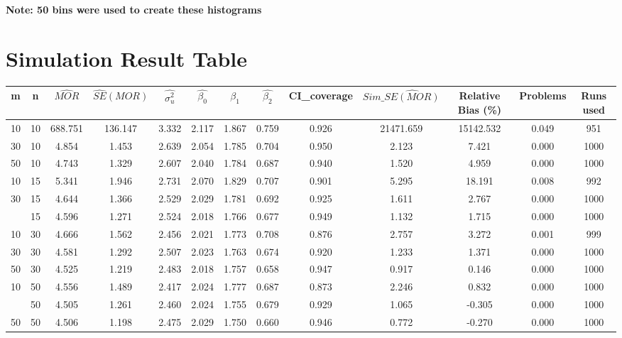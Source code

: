 \documentclass[
  letterpaper,
  DIV=11,
  numbers=noendperiod]{scrartcl}
\begin{document}
\vspace{10mm}

\textbf{Note: 50 bins were used to create these histograms}

\newpage

\recalctypearea
{}

\hypertarget{simulation-result-table}{%
\section{Simulation Result Table}\label{simulation-result-table}}

\begingroup

\fontsize{12pt}{18pt}\selectfont
\addtolength{\tabcolsep}{-2pt}

\begin{tabular}[t]{ccccccccccccc}
\toprule
m & n & $\widehat{MOR}$ & $\widehat{SE}(MOR)$ & $\widehat{\sigma_u^2}$ & $\widehat{\beta_0}$ & $\widehat{\beta_1}$ & $\widehat{\beta_2}$ & CI\_coverage & $Sim\_\widehat{SE(MOR)}$ & Relative Bias (\%) & Problems & Runs used\\
\midrule
10 & 10 & 688.751 & 136.147 & 3.332 & 2.117 & 1.867 & 0.759 & 0.926 & 21471.659 & 15142.532 & 0.049 & 951\\
30 & 10 & 4.854 & 1.453 & 2.639 & 2.054 & 1.785 & 0.704 & 0.950 & 2.123 & 7.421 & 0.000 & 1000\\
50 & 10 & 4.743 & 1.329 & 2.607 & 2.040 & 1.784 & 0.687 & 0.940 & 1.520 & 4.959 & 0.000 & 1000\\
10 & 15 & 5.341 & 1.946 & 2.731 & 2.070 & 1.829 & 0.707 & 0.901 & 5.295 & 18.191 & 0.008 & 992\\
30 & 15 & 4.644 & 1.366 & 2.529 & 2.029 & 1.781 & 0.692 & 0.925 & 1.611 & 2.767 & 0.000 & 1000\\
\addlinespace
50 & 15 & 4.596 & 1.271 & 2.524 & 2.018 & 1.766 & 0.677 & 0.949 & 1.132 & 1.715 & 0.000 & 1000\\
10 & 30 & 4.666 & 1.562 & 2.456 & 2.021 & 1.773 & 0.708 & 0.876 & 2.757 & 3.272 & 0.001 & 999\\
30 & 30 & 4.581 & 1.292 & 2.507 & 2.023 & 1.763 & 0.674 & 0.920 & 1.233 & 1.371 & 0.000 & 1000\\
50 & 30 & 4.525 & 1.219 & 2.483 & 2.018 & 1.757 & 0.658 & 0.947 & 0.917 & 0.146 & 0.000 & 1000\\
10 & 50 & 4.556 & 1.489 & 2.417 & 2.024 & 1.777 & 0.687 & 0.873 & 2.246 & 0.832 & 0.000 & 1000\\
\addlinespace
30 & 50 & 4.505 & 1.261 & 2.460 & 2.024 & 1.755 & 0.679 & 0.929 & 1.065 & -0.305 & 0.000 & 1000\\
50 & 50 & 4.506 & 1.198 & 2.475 & 2.029 & 1.750 & 0.660 & 0.946 & 0.772 & -0.270 & 0.000 & 1000\\
\bottomrule
\end{tabular}
\end{document}
